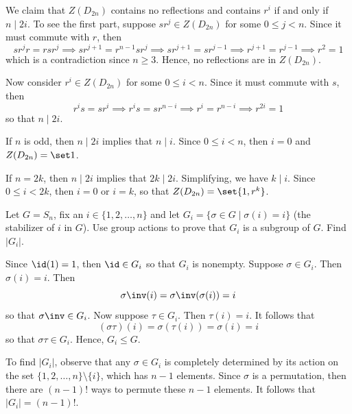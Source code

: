 \begin{sol}
    We claim that $Z(D_{2n})$ contains no reflections and contains $r^i$ if and only if $n \mid 2i$. To see the first part, suppose $sr^j \in Z(D_{2n})$ for some $0 \leq j < n$. Since it must commute with $r$, then
    \[sr^j r = r sr^j \implies sr^{j + 1} = r^{n - 1} s r^j \implies sr^{j + 1} = sr^{j - 1} \implies r^{j + 1} = r^{j - 1} \implies r^2 = 1\]
    which is a contradiction since $n \geq 3$. Hence, no reflections are in $Z(D_{2n})$.

    Now consider $r^i \in Z(D_{2n})$ for some $0 \leq i < n$. Since it must commute with $s$, then
    \[r^i s = s r^i \implies r^i s = s r^{n - i} \implies r^i = r^{n - i} \implies r^{2i} = 1\]
    so that $n \mid 2i$.
    \begin{subproblems}
        \item If $n$ is odd, then $n \mid 2i$ implies that $n \mid i$. Since $0 \leq i < n$, then $i = 0$ and $Z(D_{2n}) = \set 1$.
        \item If $n = 2k$, then $n \mid 2i$ implies that $2k \mid 2i$. Simplifying, we have $k \mid i$. Since $0 \leq i < 2k$, then $i = 0$ or $i = k$, so that $Z(D_{2n}) = \set{1, r^k}$. \qh
    \end{subproblems}
\end{sol}

\begin{exercise} \label{ex2.2.8}
    Let $G=S_n$, fix an $i \in \{1, 2, \dots, n\}$ and let $G_i=\{\sigma\in G\mid\sigma(i)=i\}$ (the stabilizer of $i$ in $G$). Use group actions to prove that $G_i$ is a subgroup of $G$. Find $|G_i|$.
\end{exercise}

\begin{sol}
    Since $\id(1) = 1$, then $\id \in G_i$ so that $G_i$ is nonempty. Suppose $\sigma \in G_i$. Then $\sigma(i) = i$. Then
    \[\sigma\inv(i) = \sigma\inv(\sigma(i)) = i\]
    so that $\sigma\inv \in G_i$. Now suppose $\tau \in G_i$. Then $\tau(i) = i$. It follows that
    \[(\sigma \tau)(i) = \sigma(\tau(i)) = \sigma(i) = i\]
    so that $\sigma \tau \in G_i$. Hence, $G_i \leq G$.

    To find $|G_i|$, observe that any $\sigma \in G_i$ is completely determined by its action on the set $\{1, 2, \ldots, n\} \setminus \{i\}$, which has $n - 1$ elements. Since $\sigma$ is a permutation, then there are $(n - 1)!$ ways to permute these $n - 1$ elements. It follows that $|G_i| = (n - 1)!$.
\end{sol}

